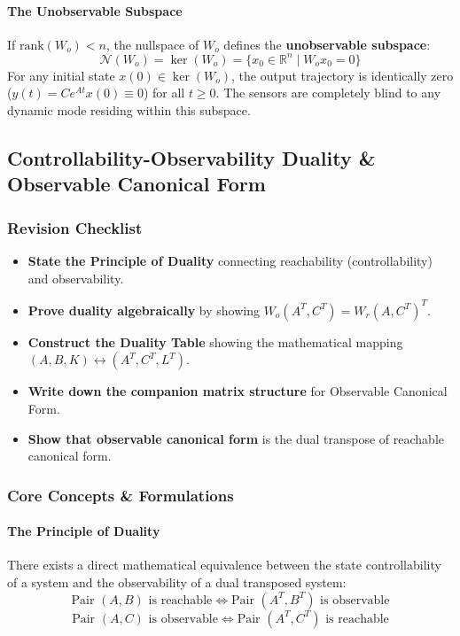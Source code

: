 \documentclass[12pt,onecolumn,twoside ]{article}
\begin{document}
	\paragraph{The Unobservable Subspace}
	If $\text{rank}(W_o) < n$, the nullspace of $W_o$ defines the \textbf{unobservable subspace}: \[
	\mathcal{N}(W_o) = \ker(W_o) = \{ x_0 \in \mathbb{R}^n \mid W_o x_0 = 0 \}
	\] For any initial state $x(0) \in \ker(W_o)$, the output trajectory is identically zero ($y(t) = C e^{At} x(0) \equiv 0$) for all $t \ge 0$. The sensors are completely blind to any dynamic mode residing within this subspace.
	
	\subsection{Controllability-Observability Duality \& Observable Canonical Form}
	\subsubsection{Revision Checklist}
	\begin{itemize}
		\item[$\square$]
		\textbf{State the Principle of Duality} connecting reachability (controllability) and observability.
		\item[$\square$]
		\textbf{Prove duality algebraically} by showing $W_o(A^T, C^T) = W_r(A, C^T)^T$.
		\item[$\square$]
		\textbf{Construct the Duality Table} showing the mathematical mapping $(A, B, K) \longleftrightarrow (A^T, C^T, L^T)$.
		\item[$\square$]
		\textbf{Write down the companion matrix structure} for Observable Canonical Form.
		\item[$\square$]
		\textbf{Show that observable canonical form} is the dual transpose of reachable canonical form.
	\end{itemize}
	
	\subsubsection{Core Concepts \& Formulations}
	\paragraph{The Principle of Duality}
	There exists a direct mathematical equivalence between the state controllability of a system and the observability of a dual transposed system: \[
	\text{Pair } (A, B) \text{ is reachable} \iff \text{Pair } (A^T, B^T) \text{ is observable}
	\] \[
	\text{Pair } (A, C) \text{ is observable} \iff \text{Pair } (A^T, C^T) \text{ is reachable}
	\]
\end{document}
